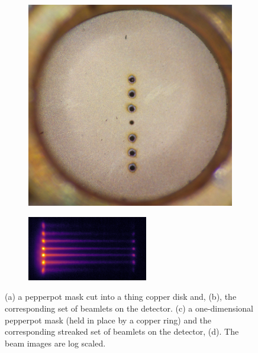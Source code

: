 \begin{figure}
\begin{subfigure}{0.49\linewidth}
    \caption{}
    \label{figure:pepperpot_image}
    \end{subfigure}
    
    \begin{subfigure}{0.49\linewidth}
    \centering
    \includegraphics[width=\linewidth]{part2/Figs/example_pepperpot_1d.jpg}
    \caption{}
    \label{figure:1d_pepperpot}
    \end{subfigure}
    \begin{subfigure}{0.49\linewidth}
    \centering
    \includegraphics[width=\linewidth]{part2/Figs/example_streaked_pepperpot.png}
    \caption{}
    \label{figure:streaked_1d_pepperpot}
    \end{subfigure}
    \caption{(a) a pepperpot mask cut into a thing copper disk and, (b), the corresponding set of beamlets on the detector. (c) a one-dimensional pepperpot mask (held in place by a copper ring) and the corresponding streaked set of beamlets on the detector, (d). The beam images are log scaled.}
    \label{figure:pepperpot_example}
\end{figure}

